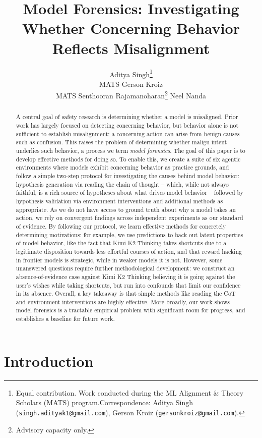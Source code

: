 \documentclass{article}
\title{Model Forensics: Investigating Whether Concerning Behavior Reflects Misalignment}
\author{%
  Aditya Singh\thanks{Equal contribution. Work conducted during the ML Alignment \& Theory Scholars (MATS) program.\newline Correspondence: Aditya Singh (\texttt{singh.adityak1@gmail.com}), Gerson Kroiz (\texttt{gersonkroiz@gmail.com}).} \\
  MATS
  \And
  Gerson Kroiz\footnotemark[1] \\
  MATS
  \And
  Senthooran Rajamanoharan\thanks{Advisory capacity only.}
  \And
  Neel Nanda\footnotemark[2]
}
\begin{document}
\maketitle

\begin{abstract}
A central goal of safety research is determining whether a model is misaligned. Prior work has largely focused on detecting concerning behavior, but behavior alone is not sufficient to establish misalignment: a concerning action can arise from benign causes such as confusion. This raises the problem of determining whether malign intent underlies such behavior, a process we term \textit{model forensics}. The goal of this paper is to develop effective methods for doing so. To enable this, we create a suite of six agentic environments where models exhibit concerning behavior as practice grounds, and follow a simple two-step protocol for investigating the causes behind model behavior: hypothesis generation via reading the chain of thought -- which, while not always faithful, is a rich source of hypotheses about what drives model behavior -- followed by hypothesis validation via environment interventions and additional methods as appropriate. As we do not have access to ground truth about why a model takes an action, we rely on convergent findings across independent experiments as our standard of evidence. By following our protocol, we learn effective methods for concretely determining motivations: for example, we use predictions to back out latent properties of model behavior, like the fact that Kimi K2 Thinking takes shortcuts due to a legitimate disposition towards less effortful courses of action, and that reward hacking in frontier models is strategic, while in weaker models it is not. However, some unanswered questions require further methodological development: we construct an absence-of-evidence case against Kimi K2 Thinking believing it is going against the user's wishes while taking shortcuts, but run into confounds that limit our confidence in its absence. Overall, a key takeaway is that simple methods like reading the CoT and environment interventions are highly effective. More broadly, our work shows model forensics is a tractable empirical problem with significant room for progress, and establishes a baseline for future work.

\end{abstract}

\section{Introduction}
\end{document}
